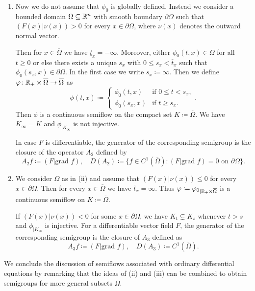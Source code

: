 \begin{example}
\begin{enumerate}[\upshape (i), wide, labelindent=.25em]
	\item 
	Now we do not assume that  $\phi_0$ is globally defined.
	Instead we consider a bounded domain $\Omega \subseteq \mathbb{R}^n$ with smooth boundary $\partial\Omega$ such that $(F(x)|\nu(x)) > 0$ for every $x \in \partial\Omega$, where $\nu(x)$ denotes the outward normal vector.
	
	Then for $x \in \overline{\Omega}$ we have $\underline{t}_{x} = -\infty$.
	Moreover, either $\phi_{0}(t,x) \in \Omega$ for all $t \geq 0$ or else there exists a unique $s_{x}$ with $0 \leq s_{x} < \overline{t}_{x}$ such that $\phi_{0}(s_{x},x) \in \partial\Omega$.
	In the first case we write $s_{x} \coloneq \infty$.
	Then we define $\phi \colon \R_{+} \times \overline{\Omega} \to \overline{\Omega}$ as 
	\[\phi(t,x) \coloneq \begin{cases}
		\phi_{0}(t,x) & \text{if } 0 \leq t < s_{x}  ,  \\
		\phi_{0}(s_{x},x) & \text{if } t \geq s_{x} .
	\end{cases} .\]
	Then $\phi$ is a continuous semiflow on the compact set $K \coloneq \overline{\Omega}$.
	We have $K_{\infty} = K$ and $\phi_{|K_{\infty}}$ is not injective.
	
	In case $F$ is differentiable, the generator of the corresponding semigroup is the closure of the operator $A_{2}$ defined by
	\[
	A_{2}f \coloneq (F|\text{grad }f), \quad D(A_{2}) \coloneq \{f \in C^1(\overline{\Omega}) \colon (F|\text{grad }f) = 0 \text{ on } \partial\Omega\}.	
	\]
	
	\item 
	We consider $\Omega$ as in (ii) and assume that $(F(x)|\nu(x)) \leq 0$ for every $x \in \partial\Omega$.
	Then for every $x \in \overline{\Omega}$ we have $\overline{t}_{x} = \infty$.
	Thus $\phi \coloneq {\phi_{0}}_{|\R_{+}\times\overline{\Omega}}$ is a continuous semiflow on $K \coloneq \overline{\Omega}$.
	
	If\/ $(F(x)|\nu(x)) < 0$ for some $x \in \partial\Omega$, we have $K_{t} \subsetneq K_{s}$ whenever $t > s$ and $\phi_{\vert K_{\infty}}$ is injective.
	For a differentiable vector field $F$, the generator of the corresponding semigroup is the closure of\/ $A_{3}$ defined as
	\[
	A_{3}f \coloneq (F|\text{grad }f), \quad D(A_{3}) \coloneq C^1(\overline{\Omega}).
	\]
\end{enumerate}
\end{example}
We conclude the discussion of semiflows associated with ordinary differential equations by remarking that the ideas of (ii) and (iii) can be combined to obtain semigroups for more general subsets $\Omega$.

